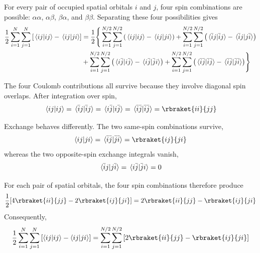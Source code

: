 \documentclass[11pt,a4paper,titlepage]{article}
\numberwithin{equation}{section}
\begin{document}
For every pair of occupied spatial orbitals $i$ and $j$, four spin
combinations are possible:
  $\alpha\alpha$,
  $\alpha\beta$,
  $\beta\alpha$, and
  $\beta\beta$.
Separating these four possibilities gives
\begin{equation}
\begin{split}
  \frac{1}{2}
  \sum_{i=1}^{N}\sum_{j=1}^{N}
  \qty[
    \braket*{ij}{ij}
    -
    \braket*{ij}{ji}
  ]
  & =
  \frac{1}{2}
  \Bigg\{
  \sum_{i=1}^{N/2}\sum_{j=1}^{N/2}
  \qty(
    \braket*{ij}{ij}
    -
    \braket*{ij}{ji}
  )
  +
  \sum_{i=1}^{N/2}\sum_{j=1}^{N/2}
  \qty(
    \braket*{\Bar{i}j}{\Bar{i}j}
    -
    \braket*{\Bar{i}j}{j\Bar{i}}
  )
  \\
  &+
  \sum_{i=1}^{N/2}\sum_{j=1}^{N/2}
  \qty(
    \braket*{i\Bar{j}}{i\Bar{j}}
    -
    \braket*{i\Bar{j}}{\Bar{j}i}
  )
  +
  \sum_{i=1}^{N/2}\sum_{j=1}^{N/2}
  \qty(
    \braket*{\Bar{i}\Bar{j}}{\Bar{i}\Bar{j}}
    -
    \braket*{\Bar{i}\Bar{j}}{\Bar{j}\Bar{i}}
  )
  \Bigg\}
  \label{eq:rhf-four-spin-combinations}
\end{split}
\end{equation}

The four Coulomb contributions all survive because they involve diagonal
spin overlaps. After integration over spin,
\begin{equation}
  \braket*{ij}{ij}
  =
  \braket*{\Bar{i}j}{\Bar{i}j}
  =
  \braket*{i\Bar{j}}{i\Bar{j}}
  =
  \braket*{\Bar{i}\Bar{j}}{\Bar{i}\Bar{j}}
  =
  \rbraket{ii}{jj}
\end{equation}

Exchange behaves differently. The two same-spin combinations survive,
\begin{equation}
  \braket{ij}{ji}
  =
  \braket*{\Bar{i}\Bar{j}}{\Bar{j}\Bar{i}}
  =
  \rbraket{ij}{ji}
\end{equation}
whereas the two opposite-spin exchange integrals vanish,
\begin{equation}
  \braket*{\Bar{i}j}{j\Bar{i}}
  =
  \braket*{i\Bar{j}}{\Bar{j}i}
  =
  0
\end{equation}

For each pair of spatial orbitals, the four spin combinations therefore
produce
\begin{equation}
  \frac{1}{2}
  \qty[
    4\rbraket{ii}{jj}
    -
    2\rbraket{ij}{ji}
  ]
  =
  2\rbraket{ii}{jj}
  -
  \rbraket{ij}{ji}
\end{equation}
Consequently,
\begin{equation}
  \frac{1}{2}
  \sum_{i=1}^{N}\sum_{j=1}^{N}
  \qty[
    \braket{ij}{ij}
    -
    \braket{ij}{ji}
  ]
  =
  \sum_{i=1}^{N/2}\sum_{j=1}^{N/2}
  \qty[
    2\rbraket{ii}{jj}
    -
    \rbraket{ij}{ji}
  ]
  \label{eq:rhf-two-electron-spatial}
\end{equation}
\end{document}
